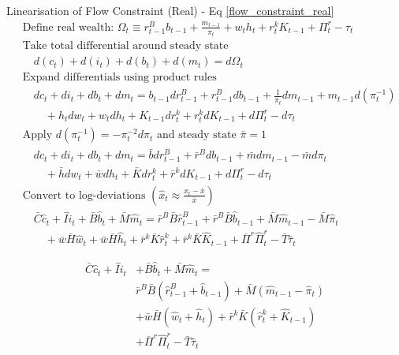 \documentclass[11pt,preprint]{elsarticle}
\numberwithin{equation}{section}
\numberwithin{figure}{section}
\numberwithin{table}{section}
\begin{document}
Linearisation of Flow Constraint (Real) - Eq \ref{flow_constraint_real}
\begin{align*}
& \text{Define real wealth: } \Omega_t \equiv r^B_{t-1}b_{t-1} + \frac{m_{t-1}}{\pi_t} + w_t h_t + r^k_t K_{t-1} + \Pi^r_t - \tau_t \\[6pt]
& \text{Take total differential around steady state} \\
& \quad d(c_t) + d(i_t) + d(b_t) + d(m_t) = d\Omega_t \\[6pt]
& \text{Expand differentials using product rules} \\
& \quad dc_t + di_t + db_t + dm_t = b_{t-1}dr^B_{t-1} + r^B_{t-1}db_{t-1} + \frac{1}{\pi_t}dm_{t-1} + m_{t-1}d\left(\pi_t^{-1}\right) \\
& \qquad + h_t dw_t + w_t dh_t + K_{t-1}dr^k_t + r^k_t dK_{t-1} + d\Pi^r_t - d\tau_t \\[6pt]
& \text{Apply } d(\pi_t^{-1}) = -\pi_t^{-2}d\pi_t \text{ and steady state } \bar{\pi}=1 \\
& \quad dc_t + di_t + db_t + dm_t = \bar{b}dr^B_{t-1} + \bar{r}^B db_{t-1} + \bar{m}dm_{t-1} - \bar{m}d\pi_t \\
& \qquad + \bar{h}dw_t + \bar{w}dh_t + \bar{K}dr^k_t + \bar{r}^k dK_{t-1} + d\Pi^r_t - d\tau_t \\[6pt]
& \text{Convert to log-deviations } (\hat{x}_t \approx \frac{x_t - \bar{x}}{\bar{x}}) \\
& \quad \bar{C}\hat{c}_t + \bar{I}\hat{i}_t + \bar{B}\hat{b}_t + \bar{M}\hat{m}_t = \bar{r}^B\bar{B}\hat{r}^B_{t-1} + \bar{r}^B\bar{B}\hat{b}_{t-1} + \bar{M}\hat{m}_{t-1} - \bar{M}\hat{\pi}_t \\
& \qquad + \bar{w}\bar{H}\hat{w}_t + \bar{w}\bar{H}\hat{h}_t + \bar{r}^k\bar{K}\hat{r}^k_t + \bar{r}^k\bar{K}\hat{K}_{t-1} + \overline{\Pi}^r \widehat{\Pi}^r_t - \bar{T}\hat{\tau}_t
\end{align*}

\begin{equation}\label{flow_constraint_real_linearised_app}
\boxed{
\begin{aligned}
\bar{C}\hat{c}_t + \bar{I}\hat{i}_t &+ \bar{B}\hat{b}_t + \bar{M}\hat{m}_t = \\
&\bar{r}^B\bar{B}(\hat{r}^B_{t-1} + \hat{b}_{t-1}) + \bar{M}(\hat{m}_{t-1} - \hat{\pi}_t) \\
&+ \bar{w}\bar{H}(\hat{w}_t + \hat{h}_t) + \bar{r}^k\bar{K}(\hat{r}^k_t + \hat{K}_{t-1}) \\
&+ \overline{\Pi}^r \widehat{\Pi}^r_t - \bar{T}\hat{\tau}_t
\end{aligned}
}
\end{equation}
\end{document}
